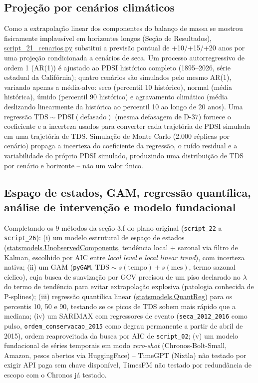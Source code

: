 \subsection{Projeção por cenários climáticos}

Como a extrapolação linear dos componentes do balanço de massa se mostrou fisicamente implausível em horizontes longos (Seção de Resultados), \url{script_21_cenarios.py} substitui a previsão pontual de +10/+15/+20 anos por uma projeção condicionada a cenários de seca. Um processo autorregressivo de ordem 1 (AR(1)) é ajustado ao PDSI histórico completo (1895--2026, série estadual da Califórnia); quatro cenários são simulados pelo mesmo AR(1), variando apenas a média-alvo: seco (percentil 10 histórico), normal (média histórica), úmido (percentil 90 histórico) e agravamento climático (média deslizando linearmente da histórica ao percentil 10 ao longo de 20 anos). Uma regressão $\mathrm{TDS} \sim \mathrm{PDSI}(\text{defasado})$ (mesma defasagem de D-37) fornece o coeficiente e a incerteza usados para converter cada trajetória de PDSI simulada em uma trajetória de TDS. Simulação de Monte Carlo (2.000 réplicas por cenário) propaga a incerteza do coeficiente da regressão, o ruído residual e a variabilidade do próprio PDSI simulado, produzindo uma distribuição de TDS por cenário e horizonte -- não um valor único.

\subsection{Espaço de estados, GAM, regressão quantílica, análise de intervenção e modelo fundacional}

Completando os 9 métodos da seção 3.f do plano original (\texttt{script\_22} a \texttt{script\_26}): (i) um modelo estrutural de espaço de estados (\url{statsmodels.UnobservedComponents}, tendência local + sazonal via filtro de Kalman, escolhido por AIC entre \textit{local level} e \textit{local linear trend}), com incerteza nativa; (ii) um GAM (\texttt{pyGAM}, $\mathrm{TDS} \sim s(\mathrm{tempo}) + s(\mathrm{mes})$, termo sazonal cíclico), cuja busca de suavização por GCV precisou de um piso declarado no $\lambda$ do termo de tendência para evitar extrapolação explosiva (patologia conhecida de P-splines); (iii) regressão quantílica linear (\url{statsmodels.QuantReg}) para os percentis 10, 50 e 90, testando se os picos de TDS sobem mais rápido que a mediana; (iv) um SARIMAX com regressores de evento (\texttt{seca\_2012\_2016} como pulso, \texttt{ordem\_conservacao\_2015} como degrau permanente a partir de abril de 2015), ordem reaproveitada da busca por AIC de \texttt{script\_02}; (v) um modelo fundacional de séries temporais em modo \textit{zero-shot} (Chronos-Bolt-Small, Amazon, pesos abertos via HuggingFace) -- TimeGPT (Nixtla) não testado por exigir API paga sem chave disponível, TimesFM não testado por redundância de escopo com o Chronos já testado.

